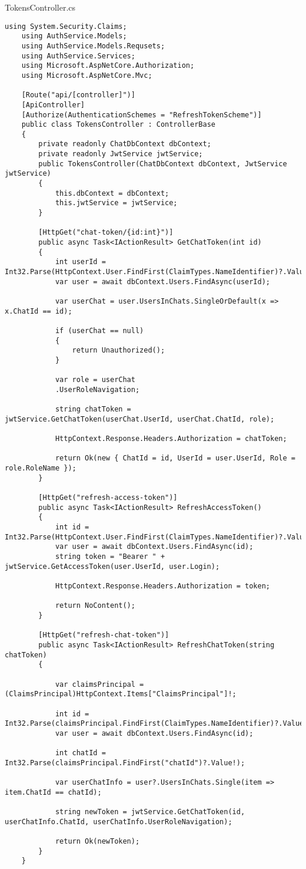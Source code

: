 TokensController.cs
\begin{lstlisting}[style=c#]
	using System.Security.Claims;
	using AuthService.Models;
	using AuthService.Models.Requsets;
	using AuthService.Services;
	using Microsoft.AspNetCore.Authorization;
	using Microsoft.AspNetCore.Mvc;
	
	[Route("api/[controller]")]
	[ApiController]
	[Authorize(AuthenticationSchemes = "RefreshTokenScheme")]
	public class TokensController : ControllerBase
	{
		private readonly ChatDbContext dbContext;
		private readonly JwtService jwtService;
		public TokensController(ChatDbContext dbContext, JwtService jwtService)
		{
			this.dbContext = dbContext;
			this.jwtService = jwtService;
		}
		
		[HttpGet("chat-token/{id:int}")]
		public async Task<IActionResult> GetChatToken(int id)
		{
			int userId = Int32.Parse(HttpContext.User.FindFirst(ClaimTypes.NameIdentifier)?.Value!);
			var user = await dbContext.Users.FindAsync(userId);
			
			var userChat = user.UsersInChats.SingleOrDefault(x => x.ChatId == id);
			
			if (userChat == null)
			{
				return Unauthorized();
			}
			
			var role = userChat
			.UserRoleNavigation;
			
			string chatToken = jwtService.GetChatToken(userChat.UserId, userChat.ChatId, role);
			
			HttpContext.Response.Headers.Authorization = chatToken;
			
			return Ok(new { ChatId = id, UserId = user.UserId, Role = role.RoleName });
		}
		
		[HttpGet("refresh-access-token")]
		public async Task<IActionResult> RefreshAccessToken()
		{
			int id = Int32.Parse(HttpContext.User.FindFirst(ClaimTypes.NameIdentifier)?.Value!);
			var user = await dbContext.Users.FindAsync(id);
			string token = "Bearer " + jwtService.GetAccessToken(user.UserId, user.Login);
			
			HttpContext.Response.Headers.Authorization = token;
			
			return NoContent();
		}
		
		[HttpGet("refresh-chat-token")]
		public async Task<IActionResult> RefreshChatToken(string chatToken)
		{
			
			var claimsPrincipal = (ClaimsPrincipal)HttpContext.Items["ClaimsPrincipal"]!;
			
			int id = Int32.Parse(claimsPrincipal.FindFirst(ClaimTypes.NameIdentifier)?.Value!);
			var user = await dbContext.Users.FindAsync(id);
			
			int chatId = Int32.Parse(claimsPrincipal.FindFirst("chatId")?.Value!);
			
			var userChatInfo = user?.UsersInChats.Single(item => item.ChatId == chatId);
			
			string newToken = jwtService.GetChatToken(id, userChatInfo.ChatId, userChatInfo.UserRoleNavigation);
			
			return Ok(newToken);
		}
	}
\end{lstlisting}


